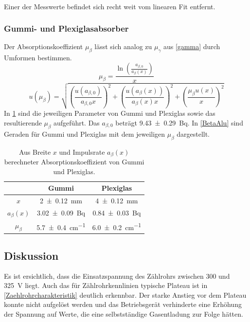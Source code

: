 \documentclass[
	a4paper,
	12pt,
	pagesize,
	ngerman
]{scrartcl}
\begin{document}
	Einer der Messwerte befindet sich recht weit vom linearen Fit entfernt.
	
	\subsubsection*{Gummi- und Plexiglasabsorber} 
	Der Absorptionskoeffizient $\mu_\beta$ lässt sich analog zu $\mu_\gamma$ aus \cref{gamma} durch Umformen bestimmen.
	\begin{equation}
		\mu_\beta = \frac{\ln \left( \frac{a_{\beta,0}}{a_\beta(x)}\right)}{x}
	\end{equation}
	\begin{equation}
	u(\mu_\beta) = \sqrt{ \left(\frac{u(a_{\beta,0})}{a_{\beta,0}x}\right)^2 + \left(\frac{u(a_\beta(x))}{a_\beta(x)x}\right)^2 + \left(\frac{\mu_\beta u(x)}{x}\right)^2}
	\end{equation}
	In \cref{TabelleMu} sind die jeweiligen Parameter von Gummi und Plexiglas sowie das resultierende $\mu_\beta$ aufgeführt.
	Das $a_{\beta,0}$ beträgt \SI{9,43 +- 0,29}{Bq}.
	In \cref{BetaAlu} sind Geraden für Gummi und Plexiglas mit dem jeweiligen $\mu_\beta$ dargestellt.
	\begin{table}[H]
		\centering
		\begin{tabular}{ c | c | c }
			&Gummi & Plexiglas \\ \hline
			$x$&\SI{2+-0,12}{mm}&\SI{4+-0,12}{mm}\\
			$a_\beta(x)$&\SI{3,02+-0,09}{Bq}&\SI{0,84+-0,03}{Bq}\\
			$\mu_\beta$&\SI{5,7+-0,4}{cm^{-1}}&\SI{6,0+-0,2}{cm^{-1}}\\
			
		\end{tabular}
		\caption{Aus Breite $x$ und Impulsrate $a_\beta(x)$ berechneter Absorptionskoeffizient von Gummi und Plexiglas.}
		\label{TabelleMu} 
	\end{table}
	
	\subsection{Diskussion}
	Es ist ersichtlich, dass die Einsatzspannung des Zählrohrs zwischen 300 und \SI{325}{V} liegt. %
	Auch das für Zählrohrkennlinien typische Plateau ist in \cref{Zaehlrohrcharakteristik} deutlich erkennbar.
	Der starke Anstieg vor dem Plateau konnte nicht aufgelöst werden und das Betriebsgerät verhinderte eine Erhöhung der Spannung auf Werte, die eine selbstständige Gasentladung zur Folge hätten.
	
\end{document}
